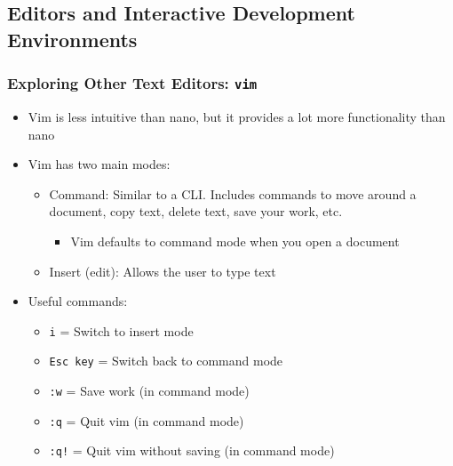 \documentclass[hyperref,pdfa,unicode,utf8,usepdftitle]{beamer}
\begin{document}
\subsection{Editors and Interactive Development Environments}

\begin{frame}
  \frametitle{Exploring Other Text Editors: \texttt{vim}}
  \begin{itemize}
  \item Vim is less intuitive than nano, but it provides a lot more
    functionality than nano
  \item Vim has two main modes:
    \begin{itemize}
    \item Command: Similar to a CLI. Includes commands to move around
      a document, copy text, delete text, save your work, etc.
      \begin{itemize}
      \item Vim defaults to command mode when you open a document
      \end{itemize}
    \item Insert (edit): Allows the user to type text
    \end{itemize}
  \item Useful commands:
    \begin{itemize}
    \item \lstinline{i} = Switch to insert mode
    \item \lstinline{Esc key} = Switch back to command mode
    \item \lstinline{:w} = Save work (in command mode)
    \item \lstinline{:q} = Quit vim (in command mode)
    \item \lstinline{:q!} = Quit vim without saving (in command mode)
    \end{itemize}
  \end{itemize}
\end{frame}
\end{document}

